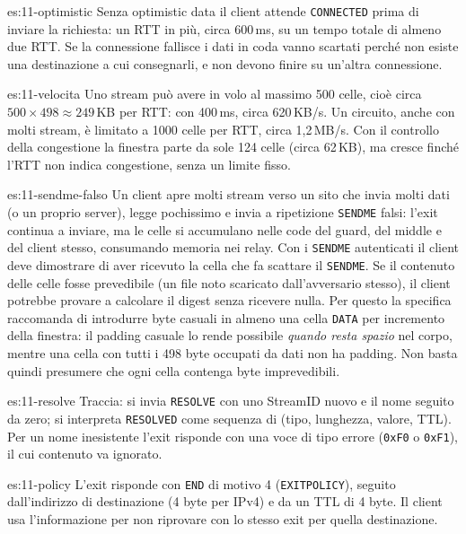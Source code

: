 \begin{soluzione}{es:11-optimistic}
Senza optimistic data il client attende \texttt{CONNECTED} prima di inviare la richiesta: un RTT in più, circa 600\,ms, su un tempo totale di almeno due RTT. Se la connessione fallisce i dati in coda vanno scartati perché non esiste una destinazione a cui consegnarli, e non devono finire su un'altra connessione.
\end{soluzione}

\begin{soluzione}{es:11-velocita}
Uno stream può avere in volo al massimo 500 celle, cioè circa $500 \times 498 \approx 249$\,KB per RTT: con 400\,ms, circa 620\,KB/s. Un circuito, anche con molti stream, è limitato a 1000 celle per RTT, circa 1,2\,MB/s. Con il controllo della congestione la finestra parte da sole 124 celle (circa 62\,KB), ma cresce finché l'RTT non indica congestione, senza un limite fisso.
\end{soluzione}

\begin{soluzione}{es:11-sendme-falso}
Un client apre molti stream verso un sito che invia molti dati (o un proprio server), legge pochissimo e invia a ripetizione \texttt{SENDME} falsi: l'exit continua a inviare, ma le celle si accumulano nelle code del guard, del middle e del client stesso, consumando memoria nei relay. Con i \texttt{SENDME} autenticati il client deve dimostrare di aver ricevuto la cella che fa scattare il \texttt{SENDME}. Se il contenuto delle celle fosse prevedibile (un file noto scaricato dall'avversario stesso), il client potrebbe provare a calcolare il digest senza ricevere nulla. Per questo la specifica raccomanda di introdurre byte casuali in almeno una cella \texttt{DATA} per incremento della finestra: il padding casuale lo rende possibile \emph{quando resta spazio} nel corpo, mentre una cella con tutti i 498 byte occupati da dati non ha padding. Non basta quindi presumere che ogni cella contenga byte imprevedibili.
\end{soluzione}

\begin{soluzione}{es:11-resolve}
Traccia: si invia \texttt{RESOLVE} con uno StreamID nuovo e il nome seguito da zero; si interpreta \texttt{RESOLVED} come sequenza di (tipo, lunghezza, valore, TTL). Per un nome inesistente l'exit risponde con una voce di tipo errore (\texttt{0xF0} o \texttt{0xF1}), il cui contenuto va ignorato.
\end{soluzione}

\begin{soluzione}{es:11-policy}
L'exit risponde con \texttt{END} di motivo 4 (\texttt{EXITPOLICY}), seguito dall'indirizzo di destinazione (4 byte per IPv4) e da un TTL di 4 byte. Il client usa l'informazione per non riprovare con lo stesso exit per quella destinazione.
\end{soluzione}

